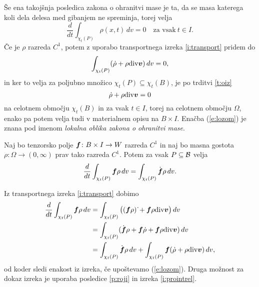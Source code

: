 Še ena takojšnja posledica zakona o ohranitvi mase je ta, da se masa katerega koli
dela delesa med gibanjem ne spreminja, torej velja
\[ \frac{d}{dt}\int_{\chi_t(P)}\rho(x,t)\,dv = 0\quad\textrm{za vsak}\ t\in I. \]
Če je $\rho$ razreda $C^1$, potem z uporabo transportnega izreka \ref{i:transport}
pridem do
\[ \int_{\chi_t(P)}(\dot{\rho}+\rho\mathrm{div}\boldsymbol v)\,dv=0, \]
in ker to velja za poljubno množico $\chi_t(P)\subseteq\chi_t(B)$, je po trditvi \ref{t:oiz}
\begin{equation} \label{e:lozom}
	\dot{\rho}+\rho\mathrm{div}\boldsymbol v=0
\end{equation}
na celotnem območju $\chi_t(B)$ in za vsak $t\in I$, torej na celotnem območju $\Omega$,
enako pa potem velja tudi v materialnem opisu na $B\times I$.
Enačba (\ref{e:lozom}) je znana pod imenom \emph{lokalna oblika zakona o ohranitvi mase}.

\begin{izrek}
	Naj bo tenzorsko polje $\boldsymbol f\colon B\times I\to W$ razreda $C^1$ in naj bo masna gostota
	$\rho\colon\Omega\to(0,\infty)$ prav tako razreda $C^1$.
	Potem za vsak $P\subseteq\mathcal B$ velja
	\[
		\frac{d}{dt}\int_{\chi_t(P)}\boldsymbol f\rho\,dv=
		\int_{\chi_t(P)}\dot{\boldsymbol f}\rho\,dv.
	\]
\end{izrek}
\proof
	Iz transportnega izreka \ref{i:transport} dobimo
	\begin{align*}
		\frac{d}{dt}\int_{\chi_t(P)}\boldsymbol f\rho\,dv
		&= \int_{\chi_t(P)}\big((\boldsymbol f\rho)\,\dot{}+\boldsymbol f\rho\mathrm{div}\boldsymbol v\big)\,dv \\
		&= \int_{\chi_t(P)}(\dot{\boldsymbol f}\rho+\boldsymbol f\dot{\rho}+\boldsymbol f\rho\mathrm{div}\boldsymbol v)\,dv\\
		&= \int_{\chi_t(P)}\dot{\boldsymbol f}\rho\,dv+
		\int_{\chi_t(P)}\boldsymbol f(\dot{\rho}+\rho\mathrm{div}\boldsymbol v)\,dv,
	\end{align*}
	od koder sledi enakost iz izreka, če upoštevamo (\ref{e:lozom}).
\endproof
Druga možnost za dokaz izreka je uporaba posledice \ref{p:roji} in
izreka \ref{i:prointrel}.